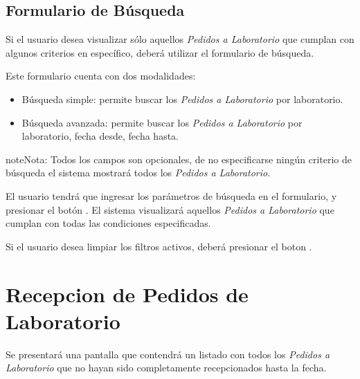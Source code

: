 \documentclass[a4paper,10pt,spanish]{sphinxmanual}
\begin{document}
\subsection{Formulario de Búsqueda}
\label{pedidosalab:formulario-de-busqueda}\label{pedidosalab:formulario-busqueda-pl}
Si el usuario desea visualizar sólo aquellos \emph{Pedidos a Laboratorio} que cumplan con algunos criterios en específico, deberá utilizar el formulario de búsqueda.


Este formulario cuenta con dos modalidades:
\begin{itemize}
\item {} 
Búsqueda simple: permite buscar los \emph{Pedidos a Laboratorio} por laboratorio.

\item {} 
Búsqueda avanzada: permite buscar los \emph{Pedidos a Laboratorio} por laboratorio, fecha desde, fecha hasta.

\end{itemize}

\begin{notice}{note}{Nota:}
Todos los campos son opcionales, de no especificarse ningún criterio de búsqueda el sistema mostrará todos los \emph{Pedidos a Laboratorio}.
\end{notice}

El usuario tendrá que ingresar los parámetros de búsqueda en el formulario, y presionar el botón . El sistema visualizará aquellos \emph{Pedidos a Laboratorio} que cumplan con todas las condiciones especificadas.

Si el usuario desea limpiar los filtros activos, deberá presionar el boton .



\section{Recepcion de Pedidos de Laboratorio}
\label{receppedidosdelab::doc}\label{receppedidosdelab:recepcion-de-pedidos-de-laboratorio}
Se presentará una pantalla que contendrá un listado con todos los \emph{Pedidos a Laboratorio} que no hayan sido completamente recepcionados hasta la fecha.
\end{document}
